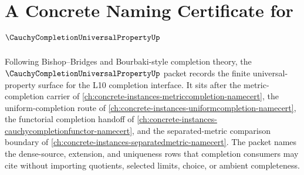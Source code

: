 \chapter{A Concrete Naming Certificate for $\CauchyCompletionUniversalPropertyUp$}
\label{ch:concrete-instances-cauchy-completion-universal-property-namecert}

Following Bishop--Bridges and Bourbaki-style completion theory, the $\CauchyCompletionUniversalPropertyUp$ packet records the finite universal-property surface for the L10 completion interface. It sits after the metric-completion carrier of \autoref{ch:concrete-instances-metriccompletion-namecert}, the uniform-completion route of \autoref{ch:concrete-instances-uniformcompletion-namecert}, the functorial completion handoff of \autoref{ch:concrete-instances-cauchycompletionfunctor-namecert}, and the separated-metric comparison boundary of \autoref{ch:concrete-instances-separatedmetric-namecert}. The packet names the dense-source, extension, and uniqueness rows that completion consumers may cite without importing quotients, selected limits, choice, or ambient completeness.

